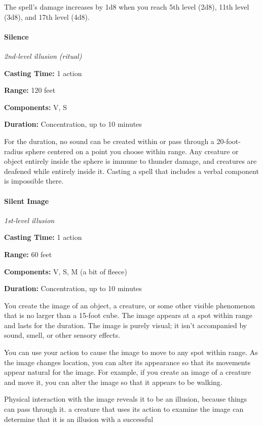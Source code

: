 \documentclass[
]{article}
\begin{document}
The spell's damage increases by 1d8 when you reach 5th level (2d8), 11th
level (3d8), and 17th level (4d8).

\hypertarget{silence}{%
\paragraph{Silence}\label{silence}}

\emph{2nd-level illusion (ritual)}

\textbf{Casting Time:} 1 action

\textbf{Range:} 120 feet

\textbf{Components:} V, S

\textbf{Duration:} Concentration, up to 10 minutes

For the duration, no sound can be created within or pass through a
20-foot-radius sphere centered on a point you choose within range. Any
creature or object entirely inside the sphere is immune to thunder
damage, and creatures are deafened while entirely inside it. Casting a
spell that includes a verbal component is impossible there.

\hypertarget{silent-image}{%
\paragraph{Silent Image}\label{silent-image}}

\emph{1st-level illusion}

\textbf{Casting Time:} 1 action

\textbf{Range:} 60 feet

\textbf{Components:} V, S, M (a bit of fleece)

\textbf{Duration:} Concentration, up to 10 minutes

You create the image of an object, a creature, or some other visible
phenomenon that is no larger than a 15-foot cube. The image appears at a
spot within range and lasts for the duration. The image is purely
visual; it isn't accompanied by sound, smell, or other sensory effects.

You can use your action to cause the image to move to any spot within
range. As the image changes location, you can alter its appearance so
that its movements appear natural for the image. For example, if you
create an image of a creature and move it, you can alter the image so
that it appears to be walking.

Physical interaction with the image reveals it to be an illusion,
because things can pass through it. a creature that uses its action to
examine the image can determine that it is an illusion with a successful
\end{document}

